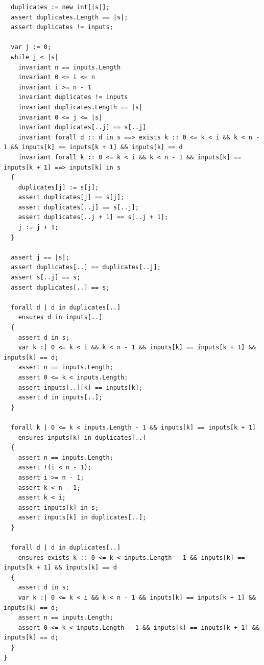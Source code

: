 \documentclass{article}
\begin{document}
\begin{lstlisting}
  duplicates := new int[|s|];
  assert duplicates.Length == |s|;
  assert duplicates != inputs;

  var j := 0;
  while j < |s|
    invariant n == inputs.Length
    invariant 0 <= i <= n
    invariant i >= n - 1
    invariant duplicates != inputs
    invariant duplicates.Length == |s|
    invariant 0 <= j <= |s|
    invariant duplicates[..j] == s[..j]
    invariant forall d :: d in s ==> exists k :: 0 <= k < i && k < n - 1 && inputs[k] == inputs[k + 1] && inputs[k] == d
    invariant forall k :: 0 <= k < i && k < n - 1 && inputs[k] == inputs[k + 1] ==> inputs[k] in s
  {
    duplicates[j] := s[j];
    assert duplicates[j] == s[j];
    assert duplicates[..j] == s[..j];
    assert duplicates[..j + 1] == s[..j + 1];
    j := j + 1;
  }

  assert j == |s|;
  assert duplicates[..] == duplicates[..j];
  assert s[..j] == s;
  assert duplicates[..] == s;

  forall d | d in duplicates[..]
    ensures d in inputs[..]
  {
    assert d in s;
    var k :| 0 <= k < i && k < n - 1 && inputs[k] == inputs[k + 1] && inputs[k] == d;
    assert n == inputs.Length;
    assert 0 <= k < inputs.Length;
    assert inputs[..][k] == inputs[k];
    assert d in inputs[..];
  }

  forall k | 0 <= k < inputs.Length - 1 && inputs[k] == inputs[k + 1]
    ensures inputs[k] in duplicates[..]
  {
    assert n == inputs.Length;
    assert !(i < n - 1);
    assert i >= n - 1;
    assert k < n - 1;
    assert k < i;
    assert inputs[k] in s;
    assert inputs[k] in duplicates[..];
  }

  forall d | d in duplicates[..]
    ensures exists k :: 0 <= k < inputs.Length - 1 && inputs[k] == inputs[k + 1] && inputs[k] == d
  {
    assert d in s;
    var k :| 0 <= k < i && k < n - 1 && inputs[k] == inputs[k + 1] && inputs[k] == d;
    assert n == inputs.Length;
    assert 0 <= k < inputs.Length - 1 && inputs[k] == inputs[k + 1] && inputs[k] == d;
  }
}
\end{lstlisting}
\end{document}
